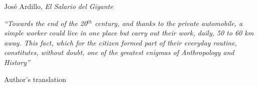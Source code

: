 \documentclass[a4paper, 11pt, twoside]{Thesis}  %
\begin{document}
\begin{flushright}
Jos\'{e} Ardillo, \emph{El Salario del Gigante}
\end{flushright}

\textit{``Towards the end of the 20$^{th}$ century, and thanks to the private
automobile, a simple worker could live in one place but carry out their work,
daily, 50 to
60 km away. This fact, which for the citizen formed part of their everyday
routine, constitutes, without doubt, one of the greatest enigmas of Anthropology
and History''}

\begin{flushright}
Author's translation
\end{flushright}



\vfill\vfill\vfill\vfill\vfill\vfill\null
\clearpage  %
\end{document}
